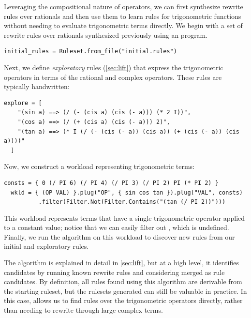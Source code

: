 Leveraging the compositional nature of \enumo operators,
  we can first synthesize rewrite rules
  over rationals and then
  use them to learn rules for
  trigonometric functions without needing
  to evaluate trigonometric terms directly.
We begin with a set of rewrite rules over rationals
  synthesized previously using an \enumo program.
\pagebreak
\begin{lstlisting}[name=trig]
  initial_rules = Ruleset.from_file("initial.rules")
\end{lstlisting}
Next, we define \emph{exploratory} rules (\autoref{sec:lift})
  that express the
  trigonometric operators in terms of
  the rational and complex operators.
These rules are typically handwritten:
\begin{lstlisting}[name=trig]
  explore = [
    "(sin a) ==> (/ (- (cis a) (cis (- a))) (* 2 I))",
    "(cos a) ==> (/ (+ (cis a) (cis (- a))) 2)",
    "(tan a) ==> (* I (/ (- (cis (- a)) (cis a)) (+ (cis (- a)) (cis a))))"
  ]
\end{lstlisting}
Now, we construct a workload representing trigonometric terms:
\begin{lstlisting}[name=trig]
  consts = { 0 (/ PI 6) (/ PI 4) (/ PI 3) (/ PI 2) PI (* PI 2) }
  wkld = { (OP VAL) }.plug("OP", { sin cos tan }).plug("VAL", consts)
          .filter(Filter.Not(Filter.Contains("(tan (/ PI 2))")))
\end{lstlisting}
This workload represents terms that have
  a single trigonometric operator applied
  to a constant value; notice that we can easily filter out
  , which is undefined.
Finally, we run the \ff algorithm on this workload to discover
  new rules from our initial and exploratory rules.

The \ff algorithm is explained in detail in \autoref{sec:lift}, but at a high level,
it identifies candidates by running known rewrite
  rules and considering merged \eclasses as rule candidates.
By definition, all rules found using this algorithm are derivable from the
  starting ruleset, but the rulesets generated can still be valuable in practice.
In this case, \ff allows us to find rules over the trigonometric operators
  directly, rather than needing to rewrite through large complex terms.

